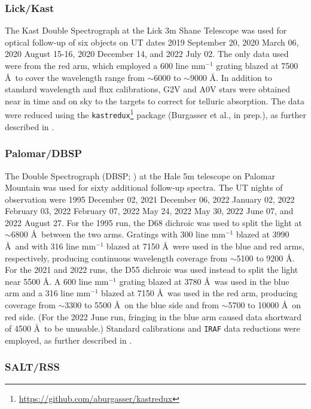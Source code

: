 \documentclass[twocolumn,tighten,twocolappendix]{aastex631}
\begin{document}
\subsubsection{Lick/Kast}

The Kast Double Spectrograph at the Lick 3m Shane Telescope was used for optical follow-up of six objects on UT dates 2019 September 20,  2020 March 06, 2020 August 15-16, 2020 December 14, and 2022 July 02. The only data used were from the red arm, which employed a 600 line mm$^{-1}$ grating blazed at 7500 \AA\ to cover the wavelength range from $\sim$6000 to $\sim$9000 \AA. In addition to standard wavelength and flux calibrations, G2V and A0V stars were obtained near in time and on sky to the targets to correct for telluric absorption. The data were reduced using the \texttt{kastredux}\footnote{\url{https://github.com/aburgasser/kastredux}} package (Burgasser et al., in prep.), as further described in \cite{schneider2021}.

\subsubsection{Palomar/DBSP}

The Double Spectrograph (DBSP; \citealt{oke1982}) at the Hale 5m telescope on Palomar Mountain was used for sixty additional follow-up spectra. The UT nights of observation were 1995 December 02, 2021 December 06, 2022 January 02, 2022 February 03, 2022 February 07, 2022 May 24, 2022 May 30, 2022 June 07, and 2022 August 27. For the 1995 run, the D68 dichroic was used to split the light at $\sim$6800 \AA\ between the two arms. Gratings with 300 line mm$^{-1}$ blazed at 3990 \AA\ and with 316 line mm$^{-1}$ blazed at 7150 \AA\ were used in the blue and red arms, respectively, producing continuous wavelength coverage from $\sim$5100 to 9200 \AA. For the 2021 and 2022 runs, the D55 dichroic was used instead to split the light near 5500 \AA. A 600 line mm$^{-1}$ grating blazed at 3780 \AA\ was used in the blue arm and a 316 line mm$^{-1}$ blazed at 7150 \AA\ was used in the red arm, producing coverage from $\sim$3300 to 5500 \AA\ on the blue side and from $\sim$5700 to 10000 \AA\ on red side. (For the 2022 June run, fringing in the blue arm caused data shortward of 4500 \AA\ to be unusable.) Standard calibrations and \texttt{IRAF} data reductions were employed, as further described in \cite{kirkpatrick1991}.

\subsubsection{SALT/RSS}
\end{document}

